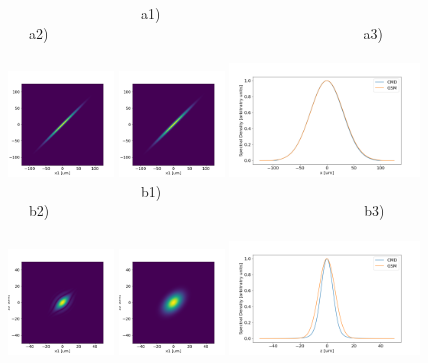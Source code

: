 \documentclass{iopconfser}
\begin{document}
\begin{figure}[H]
    \centering
~~~~~~~~~~~~~~~~~~~a1)~~~~~~~~~~~~~~~~~~~~~~~~~~~~~~~~~~~~~~~~~a2)~~~~~~~~~~~~~~~~~~~~~~~~~~~~~~~~~~~~~~~~~~~~~a3)~~~~~~~~~~~~~~~~~~~~~~~~~~~~~~~~~~~~~~~~~\\
    \includegraphics[width=0.25\textwidth]{figures/CMD_H.png}
    \includegraphics[width=0.25\textwidth]{figures/GSM_H.png}
    \includegraphics[width=0.45\textwidth]{figures/SD_H.png}\\
~~~~~~~~~~~~~~~~~~~b1)~~~~~~~~~~~~~~~~~~~~~~~~~~~~~~~~~~~~~~~~~b2)~~~~~~~~~~~~~~~~~~~~~~~~~~~~~~~~~~~~~~~~~~~~~b3)~~~~~~~~~~~~~~~~~~~~~~~~~~~~~~~~~~~~~~~~~\\
    \includegraphics[width=0.25\textwidth]{figures/CMD_V.png}
    \includegraphics[width=0.25\textwidth]{figures/GSM_V.png}
    \includegraphics[width=0.45\textwidth]{figures/SD_V.png}


\end{figure}
\end{document}
